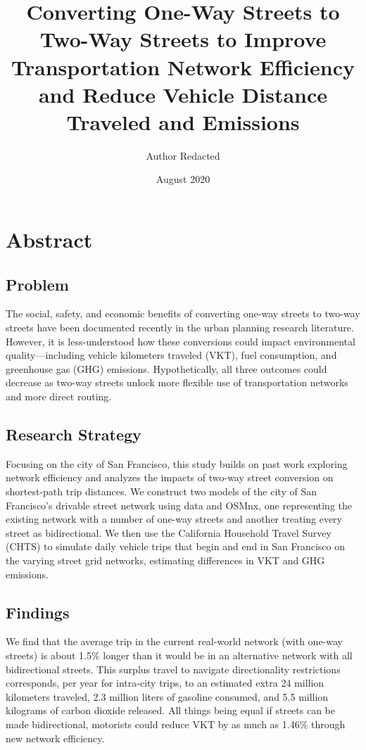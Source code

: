 \documentclass{article}
\author{}
\title{Converting One-Way Streets to Two-Way Streets to Improve Transportation Network Efficiency and Reduce Vehicle Distance Traveled and Emissions}
\author{Author Redacted}
\date{August 2020}
\begin{document}
\maketitle

\newpage
\section{Abstract}


\subsection{Problem}

The social, safety, and economic benefits of converting one-way streets to two-way streets have been documented recently in the urban planning research literature. However, it is less-understood how these conversions could impact environmental quality---including vehicle kilometers traveled (VKT), fuel consumption, and greenhouse gas (GHG) emissions. Hypothetically, all three outcomes could decrease as two-way streets unlock more flexible use of transportation networks and more direct routing. 

\subsection{Research Strategy}

Focusing on the city of San Francisco, this study builds on past work exploring network efficiency and analyzes the impacts of two-way street conversion on shortest-path trip distances.  We construct two models of the city of San Francisco's drivable street network using data and OSMnx, one representing the existing network with a number of one-way streets and another treating every street as bidirectional. We then use the California Household Travel Survey (CHTS) to simulate daily vehicle trips that begin and end in San Francisco on the varying street grid networks, estimating differences in VKT and GHG emissions. 

\subsection{Findings}
We find that the average trip in the current real-world network (with one-way streets) is about 1.5\% longer than it would be in an alternative network with all bidirectional streets. This surplus travel to navigate directionality restrictions corresponds, per year for intra-city trips, to an estimated extra 24 million kilometers traveled, 2.3 million liters of gasoline consumed, and 5.5 million kilograms of carbon dioxide released. All things being equal if streets can be made bidirectional, motorists could reduce VKT by as much as 1.46\% through new network efficiency. 
\end{document}
